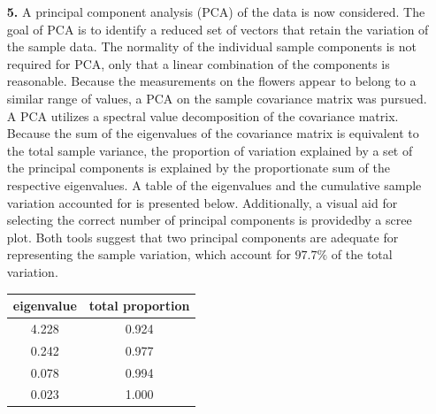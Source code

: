 \newpage
\begin{enumerate}
\item[\bf{5.}]	
	A principal component analysis (PCA) of the data is now considered. The goal of PCA is to identify a reduced set of vectors that retain the variation of the sample data. The normality of the individual sample components is not required for PCA, only that a linear combination of the components is reasonable. Because the measurements on the flowers appear to belong to a similar range of values, a PCA on the sample covariance matrix was pursued. A PCA utilizes a spectral value decomposition of the covariance matrix. Because the sum of the eigenvalues of the covariance matrix is equivalent to the total sample variance, the proportion of variation explained by a set of the principal components is explained by the proportionate sum of the respective eigenvalues. A table of the eigenvalues and the cumulative sample variation accounted for is presented below. Additionally, a visual aid for selecting the correct number of principal components is providedby a scree plot. Both tools suggest that two principal components are adequate for representing the sample variation, which account for $97.7\%$ of the total variation.

\begin{center}
\begin{tabular}{|c c |}
	\hline
	eigenvalue & total proportion \\
	\hline
	4.228 & 0.924 \\
	0.242 & 0.977 \\
	0.078 & 0.994 \\
	0.023 & 1.000 \\
	\hline
\end{tabular}
\end{center}


\end{enumerate}
